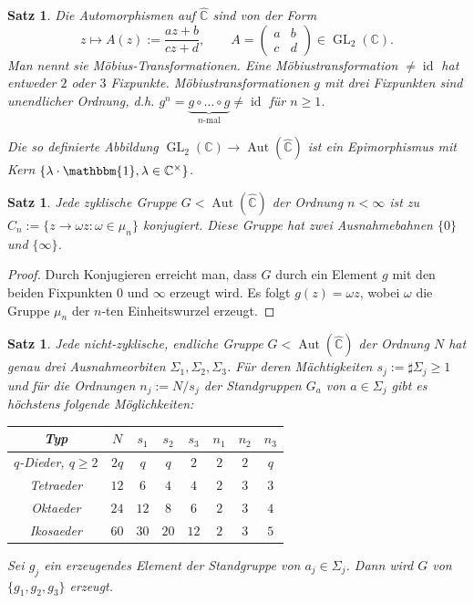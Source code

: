\documentclass[12pt,a4paper]{article}
\theoremstyle{plain}
\newtheorem{Satz}[Theorem]{Satz}
\newcommand{\C}{\mathbb{C}}
\newcommand{\Ch}{\hat{\C}}
\numberwithin{equation}{section}
\begin{document}
\begin{Satz} Die Automorphismen auf $\Ch$ sind von der Form \[ z\mapsto A(z):=\frac{az+b}{cz+d},\qquad A=\begin{pmatrix}
a & b \\ c & d
\end{pmatrix} \in \operatorname{GL}_2(\C). \] Man nennt sie Möbius-Transformationen. Eine Möbiustransformation $\neq \operatorname{id}$ hat entweder $2$ oder $3$ Fixpunkte. Möbiustransformationen $g$ mit drei Fixpunkten sind unendlicher Ordnung, d.h. $g^n = \underbrace{g\circ  \ldots \circ g}_{n\text{-mal}} \neq \operatorname{id}$ für $n \geq 1$. 

Die so definierte Abbildung $\operatorname{GL}_2(\C) \rightarrow \operatorname{Aut}(\Ch)$ ist ein Epimorphismus mit Kern $\{\lambda\cdot \mathbbm{1}, \lambda \in \C^\times\}$.
\end{Satz}
\begin{Satz} Jede zyklische Gruppe $G < \operatorname{Aut}(\Ch)$ der Ordnung $n < \infty$ ist zu $C_n := \{z \rightarrow \omega z : \omega\in\mu_n \}$ konjugiert. Diese Gruppe hat zwei Ausnahmebahnen $\{0\}$ und $\{\infty\}$. 
\end{Satz}
\begin{proof} Durch Konjugieren erreicht man, dass $G$ durch ein Element $g$ mit
den beiden Fixpunkten $0$ und $\infty$ erzeugt wird. Es folgt $g(z) = \omega z$, wobei
$\omega$ die Gruppe $\mu_n$ der $n$-ten Einheitswurzel erzeugt. 
\end{proof}
\begin{Satz}
Jede nicht-zyklische, endliche Gruppe $G < \operatorname{Aut}(\Ch)$ der Ordnung $N$ hat genau drei Ausnahmeorbiten $\Sigma_1,\Sigma_2,\Sigma_3$. Für deren Mächtigkeiten $s_j :=\sharp\Sigma_j \geq 1$ und für die Ordnungen $n_j:=N/s_j$ der Standgruppen $G_a$ von $a\in \Sigma_j$ gibt es höchstens folgende Möglichkeiten: \begin{center}
\begin{tabular}{|c|c|c|c|c|c|c|c|} \hline
Typ & $N$ & $s_1$ & $s_2$ & $s_3$ & $n_1$ & $n_2$ & $n_3$ \\\hline
$q$-Dieder, $q\geq 2$ & $2q$ & $q$ & $q$ & $2$ & $2$ & $2$ & $q$ \\\hline
Tetraeder & $12$ & $6$ & $4$ & $4$ & $2$ & $3$ & $3$ \\\hline
Oktaeder & $24$ & $12$ & $8$ & $6$ & $2$ & $3$ & $4$ \\\hline
Ikosaeder & $60$ & $30$ & $20$ & $12$ & $2$ & $3$ & $5$ \\\hline
\end{tabular}
\end{center}
Sei $g_j$ ein erzeugendes Element der Standgruppe von $a_j \in \Sigma_j$. Dann wird $G$ von $\{g_1, g_2, g_3\}$ erzeugt. 
\end{Satz}
\end{document}
